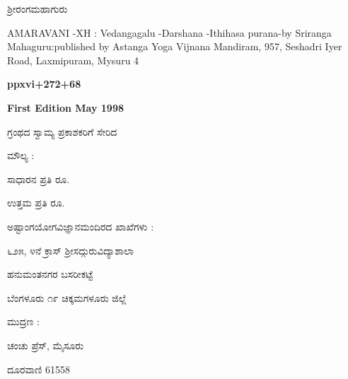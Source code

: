\vskip 5cm

\begin{center}
{\large ಶ್ರೀರಂಗಮಹಾಗುರು}
\end{center}

\newpage

{\rm AMARAVANI -XH : Vedangagalu -Darshana -Ithihasa purana-by Sriranga Mahaguru:published by Astanga Yoga Vijnana Mandiram, 957, Seshadri Iyer Road, Laxmipuram, Mysuru 4}

\textbf{ppxvi+272+68}

\medskip
\textbf{First Edition May 1998}

\medskip

ಗ್ರಂಥದ ಸ್ವಾಮ್ಯ ಪ್ರಕಾಶಕರಿಗೆ ಸೇರಿದ

\vskip 3cm
\begin{center}
ಮೌಲ್ಯ :

ಸಾಧಾರನ ಪ್ರತಿ ರೂ.

ಉತ್ತಮ ಪ್ರತಿ ರೂ.
\end{center}

\vskip 2cm

\begin{center}
ಅಷ್ಟಾಂಗಯೋಗವಿಜ್ಞಾನಮಂದಿರದ ಖಾಖೆಗಳು :

\medskip
೬೨೫, ೪ನೆ ಕ್ರಾಸ್ \hspace{1cm}  ಶ್ರೀಸದ್ಗುರುವಿದ್ಯಾಶಾಲಾ

\medskip
ಹನುಮಂತನಗರ \hspace{2.5cm} ಬಸರೀಕಟ್ಟೆ

\medskip
ಬೆಂಗಳೂರು ೧೯ \hspace{1.3cm} ಚಿಕ್ಕಮಗಳೂರು ಜಿಲ್ಲೆ
\end{center}

\vskip 2cm

\begin{center}
ಮುದ್ರಣ :

ಚಂಚು ಪ್ರೆಸ್, ಮೈಸೂರು

ದೂರವಾಣಿ {\rm 61558}
\end{center}
